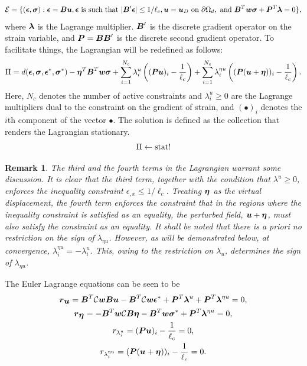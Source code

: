 \documentclass[11pt]{elsarticle}
\newtheorem*{remark}{Remark}
\begin{document}
\begin{equation}
	\mathcal{E} = \{(\mbox{\boldmath $\epsilon$},\mbox{\boldmath $\sigma$}) : \mbox{\boldmath $\epsilon$} = \mbox{\boldmath $B$} \mbox{\boldmath $u$}, \mbox{\boldmath $\epsilon$} \text{ is such that } |\mbox{\boldmath $B$}' \mbox{\boldmath $\epsilon$}|  \leq 1/{\ell_c} ,\mbox{\boldmath $u$} = \mbox{\boldmath $u$}_D \text{ on } \partial \Omega_d,
	\text{ and } \mbox{\boldmath $B$} ^T\mbox{\boldmath $w$} \mbox{\boldmath $\sigma$} + \mbox{\boldmath $P$}^T \mbox{\boldmath $\lambda$} = 0     \},
\end{equation}
where $\mbox{\boldmath $\lambda$}$ is the Lagrange multiplier. $\mbox{\boldmath $B$}'$ is the discrete gradient operator on the strain variable, and $\mbox{\boldmath $P$} = \mbox{\boldmath $B$} \mbox{\boldmath $B$}'$ is the discrete second gradient operator. To facilitate things, the Lagrangian will be redefined as follows:
\begin{equation}
	\Pi = d(\mbox{\boldmath $\epsilon$},\mbox{\boldmath $\sigma$},\mbox{\boldmath $\epsilon$}^*,\mbox{\boldmath $\sigma$}^*) - \mbox{\boldmath $\eta$}^T \mbox{\boldmath $B$} ^T \mbox{\boldmath $w$}\mbox{\boldmath $\sigma$} + \sum_{i=1}^{N_c} \lambda^u_i \left( (\mbox{\boldmath $P$} \mbox{\boldmath $u$})_i - \frac{1}{\ell_c}   \right) + \sum_{i=1}^{N_c} \lambda^{\eta u}_i \left( (\mbox{\boldmath $P$} (\mbox{\boldmath $u$} + \mbox{\boldmath $\eta$}))_i - \frac{1}{\ell_c}   \right).
\end{equation}
Here, $N_c$ denotes the number of active constraints and $\lambda^u_i \geq 0$ are the Lagrange multipliers dual to the constraint on the gradient of strain, and $(\bullet)_i$ denotes the $i$th component of the vector $\bullet$. The solution is defined as the collection that renders the Lagrangian stationary.
\begin{equation}
	\Pi  \leftarrow \operatorname{stat}!
\end{equation}

\begin{remark}
	The third and the fourth terms in the Lagrangian warrant some discussion. It is clear that the third term, together with the condition that $\lambda^u\geq0$, enforces the inequality constraint $\epsilon_{,x} \leq 1/\ell_c$. Treating $\mbox{\boldmath $\eta$}$ as the virtual displacement, the fourth term enforces the constraint that in the regions where the inequality constraint is satisfied as an equality, the perturbed field, $\mbox{\boldmath $u$}+\mbox{\boldmath $\eta$}$, must also satisfy the constraint as an equality. It shall be noted that there is a priori no restriction on the sign of $\lambda_{\eta u}$. However, as will be demonstrated below, at convergence, $\lambda^{\eta u}_i = -\lambda^{ u}_i$. This, owing to the restriction on $\lambda_u$, determines the sign of $\lambda_{\eta u}$.
\end{remark}

 


The Euler Lagrange equations can be seen to be
\begin{gather}
	\mbox{\boldmath $r$}_{\mbox{\boldmath $u$}} = \mbox{\boldmath $B$}^T \mathcal{C}\mbox{\boldmath $w$} \mbox{\boldmath $B$} \mbox{\boldmath $u$} - \mbox{\boldmath $B$}^T \mathcal{C}\mbox{\boldmath $w$} \mbox{\boldmath $\epsilon$} ^* + \mbox{\boldmath $P$}^T \mbox{\boldmath $\lambda$}^u +\mbox{\boldmath $P$}^T \mbox{\boldmath $\lambda$}^{\eta u}  =0, \label{residual_u_1D_DD} \\
	\mbox{\boldmath $r$}_{\mbox{\boldmath $\eta$}} = -\mbox{\boldmath $B$}^T\mbox{\boldmath $w$} \mathcal{C} \mbox{\boldmath $B$} \mbox{\boldmath $\eta$} - \mbox{\boldmath $B$}^T\mbox{\boldmath $w$} \mbox{\boldmath $\sigma$} ^* +\mbox{\boldmath $P$}^T \mbox{\boldmath $\lambda$}^{\eta u} =0, \\
	r_{\lambda^u_i} =  (\mbox{\boldmath $P$} \mbox{\boldmath $u$})_i - \frac{1}{\ell_c}  =0, \\
	r_{\lambda^{\eta u}_i} =  (\mbox{\boldmath $P$} (\mbox{\boldmath $u$} + \mbox{\boldmath $\eta$}))_i - \frac{1}{\ell_c}  =0. 
\end{gather}
\end{document}
